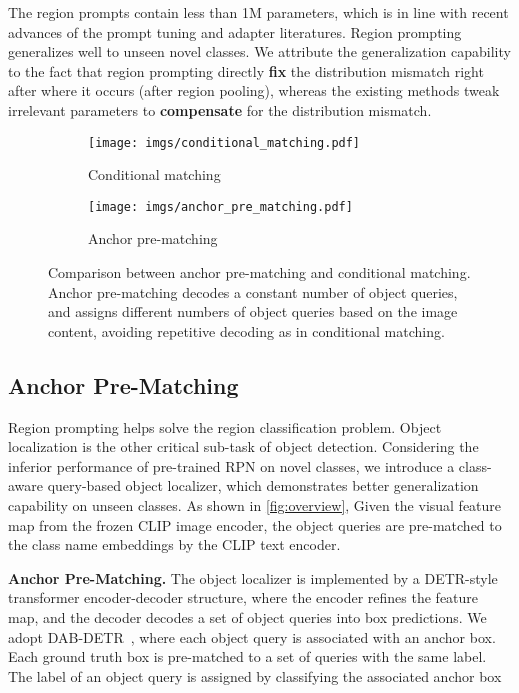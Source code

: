 \documentclass[10pt,twocolumn,letterpaper]{article}
\begin{document}
The region prompts contain less than 1M parameters, which is in line with recent advances of the prompt tuning and adapter literatures.
Region prompting generalizes well to unseen novel classes.
We attribute the generalization capability to the fact that region prompting directly \textbf{fix} the distribution mismatch right after where it occurs (after region pooling), whereas the existing methods tweak irrelevant parameters to \textbf{compensate} for the distribution mismatch.



\begin{figure}[t]
  \centering
\begin{subfigure}{1.0\linewidth}
    \texttt{[image: imgs/conditional\_matching.pdf]}
    \caption{Conditional matching}
    \label{fig:cond_matching}
  \end{subfigure}
  \hfill
  \begin{subfigure}{0.9\linewidth}
    \texttt{[image: imgs/anchor\_pre\_matching.pdf]}
    \caption{Anchor pre-matching}
    \label{fig:anchor_prematching}
  \end{subfigure}
   \caption{Comparison between anchor pre-matching and conditional matching. Anchor pre-matching decodes a constant number of object queries, and assigns different numbers of object queries based on the image content, avoiding repetitive decoding as in conditional matching.}
   \label{fig:ppm}
\end{figure}

\subsection{Anchor Pre-Matching}
\label{sec:proposal_pre_matching}

Region prompting helps solve the region classification problem. Object localization is the other critical sub-task of object detection. 
Considering the inferior performance of pre-trained RPN on novel classes, we introduce a class-aware query-based object localizer, which demonstrates better generalization capability on unseen classes.
As shown in \cref{fig:overview}, Given the visual feature map from the frozen CLIP image encoder, the object queries are pre-matched to the class name embeddings by the CLIP text encoder.



\noindent\textbf{Anchor Pre-Matching. } The object localizer is implemented by a DETR-style transformer encoder-decoder structure, where the encoder refines the feature map, and the decoder decodes a set of object queries into box predictions. We adopt DAB-DETR~\cite{dabdetr}, where each object query is associated with an anchor box. Each ground truth box is pre-matched to a set of queries with the same label. The label  of an object query is assigned by classifying the associated anchor box 
\end{document}
